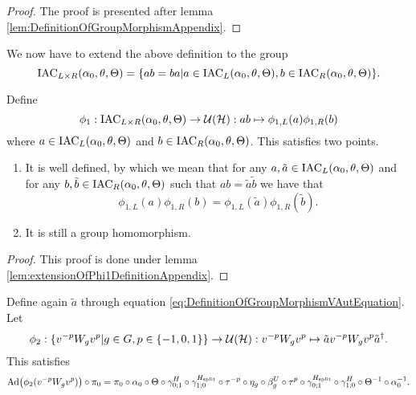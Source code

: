 \documentclass[11pt,a4paper,twoside]{article}
\numberwithin{equation}{section}
\begin{document}
\begin{proof}
	The proof is presented after lemma \ref{lem:DefinitionOfGroupMorphismAppendix}.
\end{proof}
We now have to extend the above definition to the group
\begin{equation}
	\textrm{IAC}_{L\times R}(\alpha_0,\theta,\Theta)=\{ab=ba|a\in\textrm{IAC}_{L}(\alpha_0,\theta,\Theta),b\in\textrm{IAC}_{R}(\alpha_0,\theta,\Theta)\}.
\end{equation}
\begin{lemma}\label{lem:extensionOfPhi1Definition}
	Define
	\begin{equation}
		\phi_1:\textrm{IAC}_{L\times R}(\alpha_0,\theta,\Theta)\rightarrow\mathcal U(\mathcal H):ab\mapsto \phi_{1,L}(a)\phi_{1,R}(b)
	\end{equation}
	where $a\in \textrm{IAC}_{L}(\alpha_0,\theta,\Theta)$ and $b\in \textrm{IAC}_{R}(\alpha_0,\theta,\Theta)$. This satisfies two points.
	\begin{enumerate}
		\item It is well defined, by which we mean that for any $a,\tilde{a}\in \textrm{IAC}_{L}(\alpha_0,\theta,\Theta)$ and for any $b,\tilde{b}\in \textrm{IAC}_{R}(\alpha_0,\theta,\Theta)$ such that $ab=\tilde{a}\tilde{b}$ we have that
		\begin{equation}
			\phi_{1,L}(a)\phi_{1,R}(b)=\phi_{1,L}(\tilde a)\phi_{1,R}(\tilde b).
		\end{equation}
		\item It is still a group homomorphism.
	\end{enumerate}
\end{lemma}
\begin{proof}
	This proof is done under lemma  \ref{lem:extensionOfPhi1DefinitionAppendix}.
\end{proof}
\begin{lemma}\label{lem:DefinitionOfWgMap}
	Define again $\tilde{a}$ through equation \eqref{eq:DefinitionOfGroupMorphismVAutEquation}. Let
	\begin{equation}
		\phi_2:\{v^{-p} W_g v^{p}|g\in G,p\in\{-1,0,1\}\}\rightarrow \mathcal U(\mathcal H):v^{-p} W_g v^{p}\mapsto \tilde{a}v^{-p} W_g v^{p}\tilde{a}^\dagger.
	\end{equation}
	This satisfies
	\begin{equation}\label{eq:lemDefinitionOfWgMapCondition}
		\Ad{\phi_2(v^{-p}W_g v^{p})}\circ\pi_0=\pi_0\circ \alpha_0\circ\Theta\circ\gamma^{H}_{0;1}\circ\gamma^{\Hsplit}_{1;0}\circ\tau^{-p}\circ\eta_g\circ\beta_g^U\circ\tau^p\circ\gamma^{\Hsplit}_{0;1}\circ\gamma^{H}_{1;0}\circ\Theta^{-1}\circ\alpha_0^{-1}.
	\end{equation}
\end{lemma}
\end{document}
